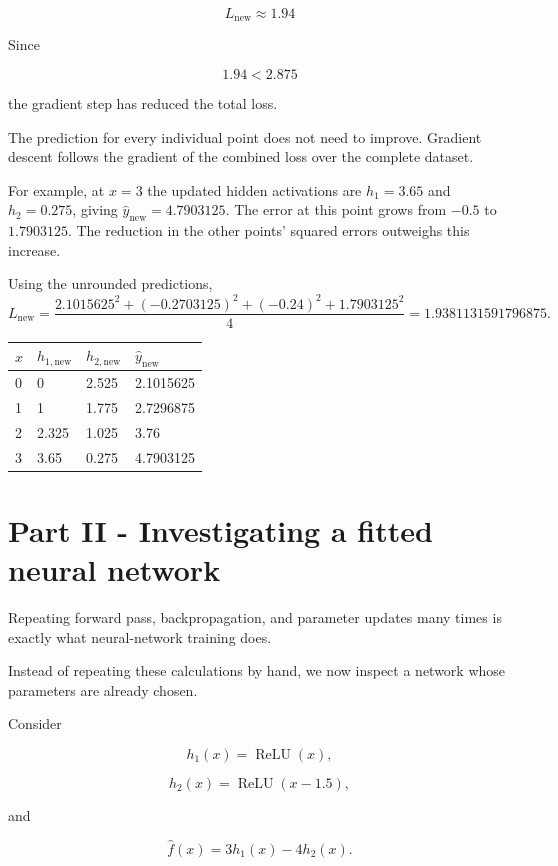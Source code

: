 \documentclass[10pt]{article}
\begin{document}
\[
L_{\mathrm{new}}\approx1.94
\]

Since

\[
1.94<2.875
\]

the gradient step has reduced the total loss.

The prediction for every individual point does not need to improve. Gradient descent follows the gradient of the combined loss over the complete dataset.


For example, at $x=3$ the updated hidden activations are $h_1=3.65$ and $h_2=0.275$, giving $\hat y_{\mathrm{new}}=4.7903125$. The error at this point grows from $-0.5$ to $1.7903125$. The reduction in the other points' squared errors outweighs this increase.

Using the unrounded predictions,
\[
L_{\mathrm{new}}=\frac{2.1015625^2+(-0.2703125)^2+(-0.24)^2+1.7903125^2}{4}=1.9381131591796875.
\]

\begin{center}
\begingroup
\small
\setlength{\tabcolsep}{4pt}
\begin{tabular}{l|l|l|l}
$x$ & $h_{1,\mathrm{new}}$ & $h_{2,\mathrm{new}}$ & $\hat y_{\mathrm{new}}$ \\ \hline
0 & 0 & 2.525 & 2.1015625 \\[1.5pt]
1 & 1 & 1.775 & 2.7296875 \\[1.5pt]
2 & 2.325 & 1.025 & 3.76 \\[1.5pt]
3 & 3.65 & 0.275 & 4.7903125 \\[1.5pt]
\end{tabular}
\endgroup
\end{center}
\par\endgroup

\clearpage
\section*{Part II - Investigating a fitted neural network}
Repeating forward pass, backpropagation, and parameter updates many times is exactly what neural-network training does.

Instead of repeating these calculations by hand, we now inspect a network whose parameters are already chosen.

Consider

\[
h_1(x)=\operatorname{ReLU}(x),
\]

\[
h_2(x)=\operatorname{ReLU}(x-1.5),
\]

and

\[
\hat f(x)=3h_1(x)-4h_2(x).
\]
\end{document}
